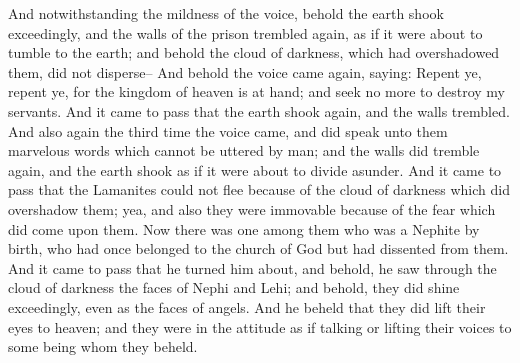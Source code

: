 \bverse \iffalse And notwithstanding the mildness of the voice, behold the earth shook exceedingly, and the walls of the prison trembled again, as if it were about to tumble to the earth; and behold the cloud of darkness, which had overshadowed them, did not disperse-- \fi
And notwithstanding the mildness of the voice, behold the earth shook exceedingly, and the walls of the prison trembled again, as if it were about to tumble to the earth; and behold the cloud of darkness, which had overshadowed them, did not disperse--
\bverse \iffalse And behold the voice came again, saying: Repent ye, repent ye, for the kingdom of heaven is at hand; and seek no more to destroy my servants. And it came to pass that the earth shook again, and the walls trembled. \fi
And behold the voice came again, saying: Repent ye, repent ye, for the kingdom of heaven is at hand; and seek no more to destroy my servants. And it came to pass that the earth shook again, and the walls trembled.
\bverse \iffalse And also again the third time the voice came, and did speak unto them marvelous words which cannot be uttered by man; and the walls did tremble again, and the earth shook as if it were about to divide asunder. \fi
And also again the third time the voice came, and did speak unto them marvelous words which cannot be uttered by man; and the walls did tremble again, and the earth shook as if it were about to divide asunder.
\bverse \iffalse And it came to pass that the Lamanites could not flee because of the cloud of darkness which did overshadow them; yea, and also they were immovable because of the fear which did come upon them. \fi
And it came to pass that the Lamanites could not flee because of the cloud of darkness which did overshadow them; yea, and also they were immovable because of the fear which did come upon them.
\bverse \iffalse Now there was one among them who was a Nephite by birth, who had once belonged to the church of God but had dissented from them. \fi
Now there was one among them who was a Nephite by birth, who had once belonged to the church of God but had dissented from them.
\bverse \iffalse And it came to pass that he turned him about, and behold, he saw through the cloud of darkness the faces of Nephi and Lehi; and behold, they did shine exceedingly, even as the faces of angels. And he beheld that they did lift their eyes to heaven; and they were in the attitude as if talking or lifting their voices to some being whom they beheld. \fi
And it came to pass that he turned him about, and behold, he saw through the cloud of darkness the faces of Nephi and Lehi; and behold, they did shine exceedingly, even as the faces of angels. And he beheld that they did lift their eyes to heaven; and they were in the attitude as if talking or lifting their voices to some being whom they beheld.
